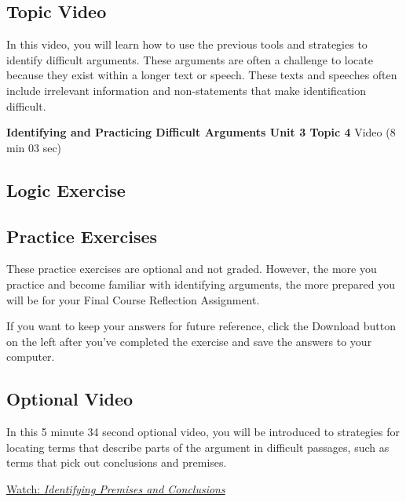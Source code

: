 \documentclass[
]{book}
\begin{document}
\hypertarget{topic-video-11}{%
\subsection*{Topic Video}\label{topic-video-11}}

In this video, you will learn how to use the previous tools and strategies to identify difficult arguments. These arguments are often a challenge to locate because they exist within a longer text or speech. These texts and speeches often include irrelevant information and non-statements that make identification difficult.

\textbf{Identifying and Practicing Difficult Arguments Unit 3 Topic 4} Video (8 min 03 sec)

\hypertarget{logic-exercise}{%
\subsection*{Logic Exercise}\label{logic-exercise}}

\begin{reflect}
\end{reflect}

\hypertarget{practice-exercises}{%
\subsection*{Practice Exercises}\label{practice-exercises}}

\begin{reflect}
These practice exercises are optional and not graded. However, the more you practice and become familiar with identifying arguments, the more prepared you will be for your Final Course Reflection Assignment.

If you want to keep your answers for future reference, click the Download button on the left after you've completed the exercise and save the answers to your computer.
\end{reflect}

\hypertarget{optional-video-11}{%
\subsection*{Optional Video}\label{optional-video-11}}

\begin{reflect}
In this 5 minute 34 second optional video, you will be introduced to strategies for locating terms that describe parts of the argument in difficult passages, such as terms that pick out conclusions and premises.

\href{https://www.youtube.com/watch?v=07mehbgE5jc}{Watch: \emph{Identifying Premises and Conclusions}}
\end{reflect}
\end{document}
